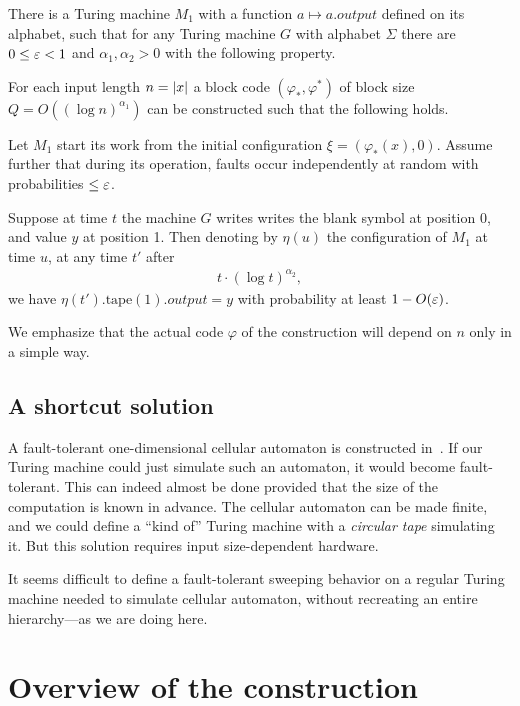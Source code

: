 \documentclass[11pt]{memoir}
\theoremstyle{definition} %
\renewcommand{\le}{\leq}
\newcommand{\Output}{\mathit{output}}
\newcommand{\Q}{Q}
\newcommand{\tape}{\mathrm{tape}}
\begin{document}
\begin{theorem}\label{thm:main-main}
There is a Turing machine \( M_{1} \) with a 
function \( a\mapsto a.\Output \) defined on its alphabet, such that
for any Turing machine \( G \) with alphabet \( \Sigma \)
there are \( 0\le\eps <1 \) and \( \alpha_{1},\alpha_{2}>0 \) 
with the following property.

For each input length \( n=\lvert x \rvert \) a block code
\( (\varphi_{*}, \varphi^{*}) \) of block size \( \Q=O((\log n)^{\alpha_{1}}) \) can be constructed 
such that the following holds.

Let \( M_{1} \) start its work from the initial configuration \( \xi=(\varphi_{*}(x),0) \).
Assume further that
during its operation, faults occur independently at random with probabilities \( \le \eps \).

Suppose at time \( t \) the machine \( G \) writes writes the blank symbol
at position 0, and value \( y \) at position 1.
Then denoting by \( \eta(u) \) the configuration of \( M_{1} \) at time \( u \),
at any time \( t' \) after
 \begin{align*}
   t\cdot (\log t)^{\alpha_{2}},
 \end{align*}
we have \( \eta(t').\tape(1).\Output= y \) with probability at least \( 1 - O(\varepsilon) \).
\end{theorem}

We emphasize that the actual
code \( \varphi \) of the construction will depend on \( n \) only in a simple way.

\subsection{A shortcut solution}

A fault-tolerant one-dimensional cellular automaton is constructed
in~\cite{GacsSorg01}.
If our Turing machine could just simulate such an automaton, it would become
fault-tolerant.
This can indeed almost be done provided that the size of the computation is known in advance.
The cellular automaton can be made finite, and we could define
a ``kind of'' Turing machine with a \emph{circular tape} simulating it.
But this solution requires input size-dependent hardware.

It seems difficult to define a fault-tolerant sweeping 
behavior on a regular Turing machine needed to 
simulate cellular automaton, without recreating an entire hierarchy---as we are doing here.


\section{Overview of the construction}
\end{document}
